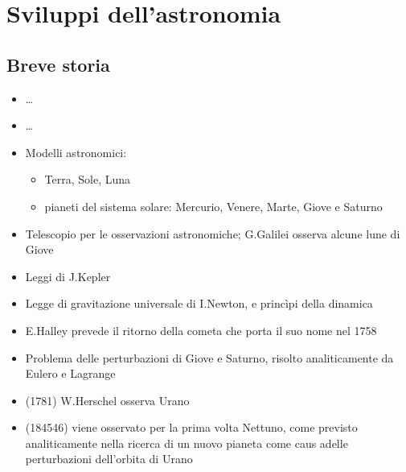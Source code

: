 \documentclass[letterpaper,10pt,italian]{jupyterBook}
\begin{document}
\sphinxstepscope


\chapter{Sviluppi dell’astronomia}
\label{\detokenize{ch/modern/astronomy:sviluppi-dell-astronomia}}\label{\detokenize{ch/modern/astronomy:physics-hs-modern-astronomy}}\label{\detokenize{ch/modern/astronomy::doc}}

\section{Breve storia}
\label{\detokenize{ch/modern/astronomy:breve-storia}}
\sphinxAtStartPar
{}
\begin{itemize}
\item {} 
\sphinxAtStartPar
…

\end{itemize}

\sphinxAtStartPar
{}
\begin{itemize}
\item {} 
\sphinxAtStartPar
…

\item {} 
\sphinxAtStartPar
Modelli astronomici:
\begin{itemize}
\item {} 
\sphinxAtStartPar
Terra, Sole, Luna

\item {} 
\sphinxAtStartPar
pianeti del sistema solare: Mercurio, Venere, Marte, Giove e Saturno

\end{itemize}

\end{itemize}

\sphinxAtStartPar
{}
\begin{itemize}
\item {} 
\sphinxAtStartPar
Telescopio per le osservazioni astronomiche; G.Galilei osserva alcune lune di Giove

\item {} 
\sphinxAtStartPar
Leggi di J.Kepler

\item {} 
\sphinxAtStartPar
Legge di gravitazione universale di I.Newton, e princìpi della dinamica

\item {} 
\sphinxAtStartPar
E.Halley prevede il ritorno della cometa che porta il suo nome nel 1758

\item {} 
\sphinxAtStartPar
Problema delle perturbazioni di Giove e Saturno, risolto analiticamente da Eulero e Lagrange

\item {} 
\sphinxAtStartPar
(1781) W.Herschel osserva Urano

\item {} 
\sphinxAtStartPar
(1845\sphinxhyphen{}46) viene osservato per la prima volta Nettuno, come previsto analiticamente nella ricerca di un nuovo pianeta come caus adelle perturbazioni dell’orbita di Urano

\end{itemize}
\end{document}
